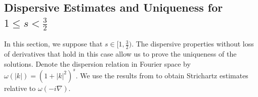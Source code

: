 \documentclass[12pt,a4paper]{amsart}
\numberwithin{equation}{section}
\begin{document}
	\subsection{Dispersive Estimates and Uniqueness for \texorpdfstring{$1\le s<\frac32$}{s between 1 and 3/2}}
	
	In this section, we suppose that $s\in[1,\frac32)$. 
	The dispersive properties without loss of derivatives that hold in this case allow us to prove the uniqueness of the solutions. Denote the dispersion relation in Fourier space by $ \omega(|k|) = (1+|k|^2)^s $. We use the results from \cite{GUO20081642} to obtain Strichartz estimates relative to $\omega(-i\nabla)$.
	
\end{document}

